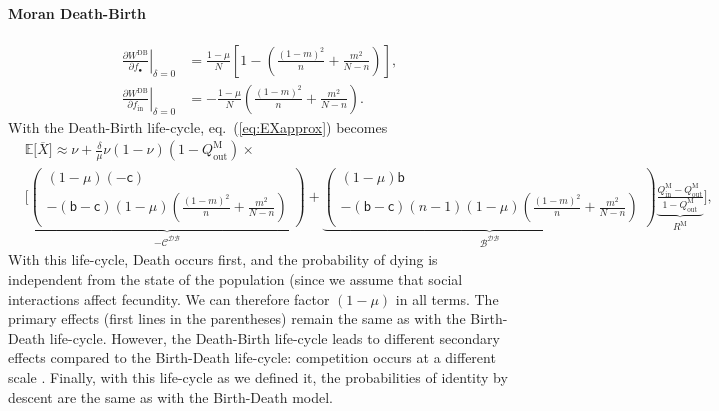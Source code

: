\documentclass[11pt, letterpaper]{article}
\renewcommand{\eqref}[1]{\textup{{\normalfont eq.~(\ref{#1}}\normalfont)}}
\newcommand{\deriv}[2]{\partial_{#2}\!{#1}\,}
\newcommand{\derivv}[3]{\left.\frac{\partial #1}{\partial #2}\right |_{#3=0}} %
\newcommand{\Esp}[1]{\mathbb{E}\big[ #1\big]}%
\newcommand{\bb}{\mathsf{b}}
\newcommand{\cc}{\mathsf{c}}
\newcommand{\Moran}{\textrm{M}}
\newcommand{\DB}{\textrm{DB}}
\newcommand{\mutbias}{\nu}
\newcommand{\inn}{\textrm{in}}
\newcommand{\out}{\textrm{out}}
\newcommand{\focal}{\bullet}
\newcommand{\selstr}{\delta}
\begin{document}
\paragraph{Moran Death-Birth}
\begin{subequations}\label{eq:dWDB}
\begin{align}
\derivv{W^{\DB}}{f_{\focal}}{\selstr} &= \frac{1-\mu}{N} \left[ 1 - \left( \frac{(1-m)^2}{n} + \frac{m^2}{N-n}  \right) \right],\\
\derivv{W^{\DB}}{f_{\inn}}{\selstr} &= - \frac{1-\mu}{N} \left( \frac{(1-m)^2}{n} + \frac{m^2}{N-n}  \right). 
\end{align}
\end{subequations}
%
%
With the Death-Birth life-cycle, \eqref{eq:EXapprox} becomes
%
\begin{equation}\label{eq:EXDB}
\begin{split}
& \Esp{\overline{X}} \approx \mutbias + 
 \frac{\selstr}{\mu}  \mutbias (1-\mutbias) (1 - Q_{\out}^{\Moran}) \times \\
 &\Bigg[ \underbrace{ \begin{pmatrix}
 (1-\mu) (-\cc) \\
- (\bb - \cc) (1-\mu) \left( \frac{(1-m)^2}{n} + \frac{m^2}{N-n}\right) 
 \end{pmatrix}
}_{-\mathcal{C^{\DB}}} + \underbrace{ \begin{pmatrix}
(1-\mu) \bb \\
- (\bb - \cc) (n-1) (1-\mu)\left( \frac{(1-m)^2}{n} + \frac{m^2}{N-n} \right) 
\end{pmatrix}
}_{\mathcal{B^{\DB}}} \underbrace{\frac{Q_{\inn}^{\Moran} - Q_{\out}^{\Moran}}{1 - Q_{\out}^{\Moran}}}_{R^{\Moran}} \Bigg],
\end{split}
\end{equation}
%
With this life-cycle, Death occurs first, and the probability of dying is independent from the state of the population (since we assume that social interactions affect fecundity. We can therefore factor $(1-\mu)$ in all terms. The primary effects (first lines in the parentheses) remain the same as with the Birth-Death life-cycle. However, the Death-Birth life-cycle leads to different secondary effects compared to the Birth-Death life-cycle: competition occurs at a different scale \citep{GrafenArchetti2008}.
Finally, with this life-cycle as we defined it, the probabilities of identity by descent are the same as with the Birth-Death model. 
\end{document}
